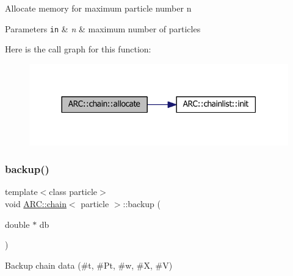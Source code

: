Allocate memory for maximum particle number n 
\begin{DoxyParams}[1]{Parameters}
\mbox{\tt in}  & {\em n} & maximum number of particles \\
\hline
\end{DoxyParams}
Here is the call graph for this function\+:
\nopagebreak
\begin{figure}[H]
\begin{center}
\leavevmode
\includegraphics[width=318pt]{classARC_1_1chain_ad0abd7b957e9d88ad2f1823f06d28a4a_cgraph}
\end{center}
\end{figure}
\hypertarget{classARC_1_1chain_a587009b6c6db0490c0f335aba732d77a}{}\label{classARC_1_1chain_a587009b6c6db0490c0f335aba732d77a} 
\subsubsection{\texorpdfstring{backup()}{backup()}}
{\footnotesize\ttfamily template$<$class particle$>$ \\
void \hyperlink{classARC_1_1chain}{A\+R\+C\+::chain}$<$ particle $>$\+::backup (\begin{DoxyParamCaption}\item[{double $\ast$}]{db }\end{DoxyParamCaption})\hspace{0.3cm}{\ttfamily [inline]}}



Backup chain data (\#t, \#\+Pt, \#w, \#X, \#V) 

